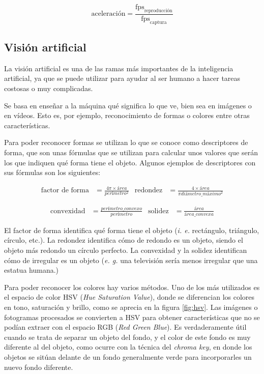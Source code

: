 \begin{equation}
	\text{aceleración} = \frac{\text{fps}_{\text{reproducción}}}{\text{fps}_{\text{captura}}}
\end{equation} 

\subsection{Visión artificial}
La visión artificial es una de las ramas más importantes de la inteligencia artificial, ya que se puede utilizar para ayudar al ser humano a hacer tareas costosas o muy complicadas.

Se basa en enseñar a la máquina qué significa lo que ve, bien sea en imágenes o en vídeos. Esto es, por ejemplo, reconocimiento de formas o colores entre otras características.

Para poder reconocer formas se utilizan lo que se conoce como descriptores de forma, que son unas fórmulas que se utilizan para calcular unos valores que serán los que indiquen qué forma tiene el objeto. Algunos ejemplos de descriptores con sus fórmulas son los siguientes:

\begin{align*}
	\text{factor de forma} &= \frac{4 \pi \times área}{perímetro^2} &
	\text{redondez} &= \frac{4 \times área}{\pi diámetro\_máximo^2}
\end{align*}

\begin{align}
	\text{convexidad} &= \frac{perímetro\_convexo}{perímetro} &
	\text{solidez} &= \frac{área}{área\_convexa}
\end{align}

El factor de forma identifica qué forma tiene el objeto (\textit{i. e.} rectángulo, triángulo, círculo, etc.). La redondez identifica cómo de redondo es un objeto, siendo el objeto más redondo un círculo perfecto. La convexidad y la solidez identifican cómo de irregular es un objeto (\textit{e. g.} una televisión sería menos irregular que una estatua humana.)

Para poder reconocer los colores hay varios métodos. Uno de los más utilizados es el espacio de color HSV (\textit{Hue Saturation Value}), donde se diferencian los colores en tono, saturación y brillo, como se aprecia en la figura \ref{fig:hsv}. Las imágenes o fotogramas procesados se convierten a HSV para obtener características que no se podían extraer con el espacio RGB (\textit{Red Green Blue}). Es verdaderamente útil cuando se trata de separar un objeto del fondo, y el color de este fondo es muy diferente al del objeto, como ocurre con la técnica del \textit{chroma key}, en donde los objetos se sitúan delante de un fondo generalmente verde para incorporarles un nuevo fondo diferente.

